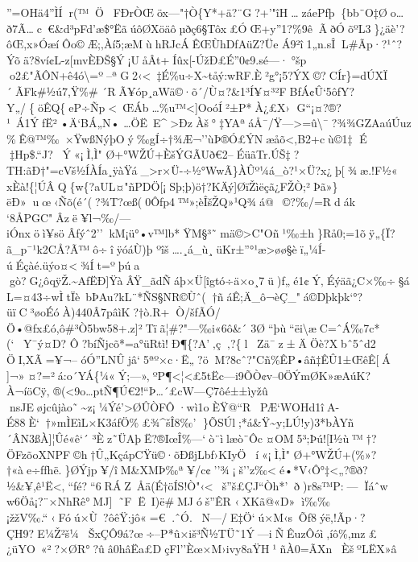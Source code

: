 ''=OHä4''ÌÍr(™ÖFÐrÒŒöx---"†Ò\{Y*+ä?¨G?+'"îH\ldotszáe­Pƒþ\{bb¨O‡Øo\ldots ð7Ã\ldotsc~€\&d³pFd'æ\$°ËãúôØXöäôµðç6§Tôx£ÓŒ+y''1?\%9êÃðÓõºL3\}¿äè'?ôŒ,x»ÓæíÔo©Æ;‚Àí5;æMùhRJcÁÊŒ\textquotesingle ÙhDfA\textquotesingle üZ?Üe
Á9²î1„n.sÎ\textquotesingle L\#Ãp·?¹ˆ?Ýõä?8ví¢L-z{[}mvÈÐŠ§Ý¡UåÂt+Íûx{[}-ÚžÐ£É''0¢9.sé---·°šp
o2£"ÃÔN+ê4ó\textbackslash=º--ªG2‹\textless~‡É\%u÷X\textasciitilde tåý:wRF.È²g°¡5?ÝX©?CÍr\}=dÚXÏ´ÃFk\#½ú7,Ÿ\%\#
´RÃ¥óp¸aWä©·õ´/Ù¤?\& 1³Í¥¤³²FBƒÁ¢Û`5ôƒY?Y„/\{öÊQ\{eP÷Ñp\textless~ŒÁb\ldots\%u™\textless{]}OoóÍ²±P*À¿£X›
G``¡¤\textbar?®?¹~Á1ÝƒË²•Ä`BÁ„N•
\ldots ÖË~E\^{}\textgreater ÐzÀš°‡YAªáÅ¯/Ÿ---\textgreater=û\textbackslash¯?¾¾GZAaúÚuz
\%Ê@™‰~×ŸwßNýþOý‰gÍ÷†¾Æ ¬''ùÞ®Ó£ÝNæåõ\textless‚B2+cù©1‡ É
‡H\textbar p\$.``J?Ý«¡Ì‚Ì"\textbar{}
Ø+°WŽÚ+ÈšÝGÃUð€2--ÉüãTr.ÚŠ‡?TH:ãÐ†"=cVš½ÍÀÍa¸ÿàŸá\_\textgreater r×Ü-÷½°WwÃ\}ÀÛº¼á\_ò?¹×Ü?x¿þ{[}¾æ.!F½«
xÈà!\{¦ÚÂQ\{w\{?aUL¤"ñPDÖ{[}¡Sþ;þ)ö†?KÄý{]}ØïŽìëçã¿FŽÒ;²Þã»\}ëÐ»uœ‹Ñõ(é´(?¾T?œß(0Ôƒp4™»;èÎšŽQ»¹Q¾á@~©?‰/=Rdák
`8ÅPGC"Âzë¥l¬‰/---iÓnxöì¥söÂfýˆ2''kM¡ü°•v™lb*ŸM§³˜mä©\textgreater C"Oñ¹‰±h\}Rå0;=1õ\textquotesingleÿ„\{Ï?ã\_p¯¹k2CÅ?Ã™ô÷îÿóáÙ)þ
ºîš\ldots.¸á\_ù¸üKr±''°¹æ\textgreater øø§èï„¼Í-úÉçàé.üýo¤\textless¾Ít=ºþúa
gò?G¿ôqÿŽ.\textasciitilde AfËÐ{]}ŸàÂŸ\_ãdÑáþ×Ü{[}îgtó÷ä×o¸7\textbar ü)ƒ„é1¢Ý‚Éýäã¿C×‰÷§áL=¤43÷wÌtÏ\textquotesingle è~bÞAu?kL¨*­ÑS§NR©Ùˆ(†ñáÊ;Ä\_ô¬èÇ\_"á©Dþkþk`°?üïC³øoÉóÀ)440Â7pâìK?†ò.R+Ò/šƒÃÓ/Ö•@ƒx£ó,ô\#³Ò5bw58+.z{]}²Tïã¦\#?"---‰i«6ô\&´
3Ø``þù``ëi\textbackslash æC=ˆÁ‰7c*(`Y¯ý¤D?
Ô ?bíÑjcõ*=a°üRtì!Ð¶\{?A'‚ç‚?\{lZä¯z±ÄÖè?Xbˆ5 ˆd2 ÖI‚XÃ=¥¬--
óÓ''LNÛjâ`5ªº×c·Ë„?öM?8cˆ?"Cñ\%ÊP•âñ‡ÊÛ1±ŒêÊ{[}Á
{]}¬»¤?=²á:o´YÁ\{¼«Ý;---»,ºP ¶\textless¦\textless£5tËc---i9ÕÒ¢v--0ÖÝmØK»æAúK?À¬íöCÿ ‚
®(\textless9o\ldots ptÑ¶Ú€2!{}``Þ\ldots´£cW---Ç7ôé±±ìyžû
nsJEøjcûjào˜\textasciitilde z¡¼Ýé'\textgreater ØÛÒFÔ·wì1oÈŸ@``RPÆ`WOHd1îA-É88È`†»mÌEìL×K3áƒÖ\%£¾\^{}šÎ8‰'
\}ÕSÚl;*á\&Ÿ\textasciitilde y;LÚ!y)3*bÀ\textquotesingle Yñ´ÂN3ßÀ{]}¦Ûé«ê`´
³Èz˜ÜAþË?®IœÎ\%---`ò¨ìlæò¨Ôc¤OM5³;Þú!{[}I½ù™­†?ÖFzõoXNPF©h†Û„KçápCŸü©·õÐ\textquotesingle ßjL bf›KIyÖí«¡Ì‚Ì"\textbar{}
Ø+°WŽÚ+(\%»?†«àe÷fƒhë.\}ØÝjp¥/îM\&XMÞ‰ª¥/c¢''¾¡š''z‰\textlessé•*V‹Ô°‡\textless„?®ð?½\&¥,ê¹Ë\textless‚``ƒé?``6RÁZ~Åä(É†öÍS!Ò"‹\textless~š''š£ÇJ``Òh*'ð)r8s™P:---Ïáˆw
w6Öå¡?¨×NhRê°MJ{]}˜FË~I)ë\#MJóš''ÊR
‹XKã@«D»ì‰‰¡žžV‰.``‹Fóú×Ù~?ôêŸ:jô«=€.ˆÓ.N---/E‡Ö`ú×M‹sÕƒ8ýë,!Ãp·?
ÇH9?E¼Ž²š¼ŠxÇÔ9á?œ÷--P*û×iš³Ñ½TÜ˜1Ý---iÑÊuzÔóì,íô\%,mz£¿üYO~«²?×ØR°?ûâ0hâËa£DçFl''Èœ×M›ivy8aŸ\textquotesingle H¹ñÀ0=ÃXnÈšºLËX»â

